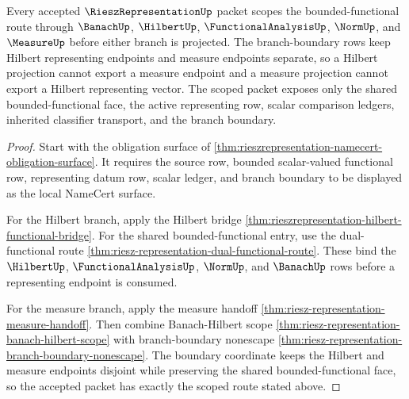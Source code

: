 \begin{theorem}
\label{thm:riesz-representation-scope-binding}
Every accepted $\RieszRepresentationUp$ packet scopes the bounded-functional route through $\BanachUp$, $\HilbertUp$, $\FunctionalAnalysisUp$, $\NormUp$, and $\MeasureUp$ before either branch is projected. The branch-boundary rows keep Hilbert representing endpoints and measure endpoints separate, so a Hilbert projection cannot export a measure endpoint and a measure projection cannot export a Hilbert representing vector. The scoped packet exposes only the shared bounded-functional face, the active representing row, scalar comparison ledgers, inherited classifier transport, and the branch boundary.
\end{theorem}
\begin{proof}
Start with the obligation surface of \autoref{thm:rieszrepresentation-namecert-obligation-surface}. It requires the source row, bounded scalar-valued functional row, representing datum row, scalar ledger, and branch boundary to be displayed as the local NameCert surface.

For the Hilbert branch, apply the Hilbert bridge \autoref{thm:rieszrepresentation-hilbert-functional-bridge}. For the shared bounded-functional entry, use the dual-functional route \autoref{thm:riesz-representation-dual-functional-route}. These bind the $\HilbertUp$, $\FunctionalAnalysisUp$, $\NormUp$, and $\BanachUp$ rows before a representing endpoint is consumed.

For the measure branch, apply the measure handoff \autoref{thm:riesz-representation-measure-handoff}. Then combine Banach-Hilbert scope \autoref{thm:riesz-representation-banach-hilbert-scope} with branch-boundary nonescape \autoref{thm:riesz-representation-branch-boundary-nonescape}. The boundary coordinate keeps the Hilbert and measure endpoints disjoint while preserving the shared bounded-functional face, so the accepted packet has exactly the scoped route stated above.
\end{proof}

